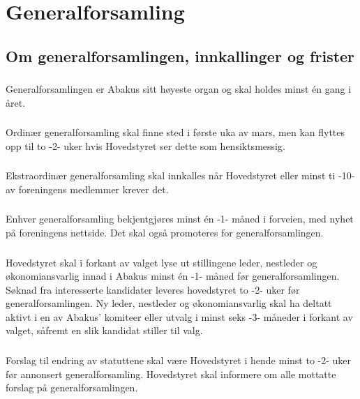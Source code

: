 \section{Generalforsamling}
\subsection{Om generalforsamlingen, innkallinger og frister}
\subsubsection{}
Generalforsamlingen er Abakus sitt høyeste organ og skal holdes minst én
gang i året.

\subsubsection{}
Ordinær generalforsamling skal finne sted i første uka av mars, men kan
flyttes opp til to -2- uker hvis Hovedstyret ser dette som hensiktsmessig.

\subsubsection{}
Ekstraordinær generalforsamling skal innkalles når Hovedstyret eller minst
ti -10- av foreningens medlemmer krever det.

\subsubsection{}
Enhver generalforsamling bekjentgjøres minst én -1- måned i forveien, med
nyhet på foreningens nettside. Det skal også promoteres for generalforsamlingen.

\subsubsection{}
Hovedstyret skal i forkant av valget lyse ut stillingene leder, nestleder og
økonomiansvarlig innad i Abakus minst én -1- måned før generalforsamlingen.
Søknad fra interesserte kandidater leveres hovedstyret to -2- uker før
generalforsamlingen. Ny leder, nestleder og økonomiansvarlig skal ha deltatt
aktivt i en av Abakus’ komiteer eller utvalg i minst seks -3- måneder i forkant
av valget, såfremt en slik kandidat stiller til valg.

\subsubsection{}
Forslag til endring av statuttene skal være Hovedstyret i hende minst to -2-
uker før annonsert generalforsamling. Hovedstyret skal informere om alle
mottatte forslag på generalforsamlingen.

